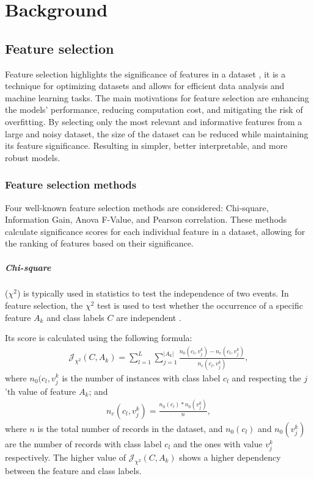 \chapter{Background}
\label{ch:background}

\section{Feature selection}
Feature selection highlights the significance of features in a dataset \cite{featureselectionzhang}, it is a technique for optimizing datasets and allows for efficient data analysis and machine learning tasks. The main motivations for feature selection are enhancing the models' performance, reducing computation cost, and mitigating the risk of overfitting.
By selecting only the most relevant and informative features from a large and noisy dataset, the size of the dataset can be reduced while maintaining its feature significance. Resulting in simpler, better interpretable, and more robust models.

\subsection{Feature selection methods}
Four well-known feature selection methods are considered: Chi-square, Information Gain, Anova F-Value, and Pearson correlation. These methods calculate significance scores for each individual feature in a dataset, allowing for the ranking of features based on their significance.
\paragraph{Chi-square}
($\chi^2$) is typically used in statistics to test the independence of two events. In feature selection, the $\chi^2$ test is used to test whether the occurrence of a specific feature $A_k$ and class labels $C$ are independent \cite{originalpaper}.

Its score is calculated using the following formula:
\begin{align}
    \mathcal{J}_{\chi^2}(C,A_k) = \sum_{l=1}^{L}\sum_{j=1}^{|A_{k}|}\frac{n_{0}(c_{l},v^{k}_{j}) - n_{e}(c_{l},v^{k}_{j})}{n_{e}(c_{l},v^{k}_{j})},
\end{align}
where $n_{0}(c_{l},v^{k}_{j}$ is the number of instances with class label $c_l$ and respecting the $j$'th value of feature $A_k$; and
\begin{align}
    n_{e}(c_{l},v^{k}_{j}) = \frac{n_{0}(c_{l})*n_{0}(v^{k}_{j})}{n},
\end{align}
where $n$ is the total number of records in the dataset, and $n_{0}(c_{l})$ and $n_{0}(v^{k}_{j})$ are the number of records with class label $c_l$ and the ones with value $v^{k}_{j}$ respectively. The higher value of $\mathcal{J}_{\chi^2}(C,A_k)$ shows a higher dependency between the feature and class labels.

